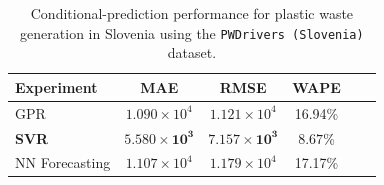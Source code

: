 \begin{table}[!ht]
	\centering
	\caption{\centering Conditional-prediction performance for plastic waste generation in Slovenia using the \texttt{PWDrivers (Slovenia)} dataset.}
	\begin{tabular}{@{}lccccc@{}}
		\toprule
		\textbf{Experiment} & \textbf{MAE}                   & \textbf{RMSE}                  & \textbf{WAPE}       \\
		\midrule
		GPR                 & \(1.090 \times 10^4\)          & \(1.121 \times 10^4\)          & 16.94\%             \\
		\textbf{SVR}        & \(\mathbf{5.580 \times 10^3}\) & \(\mathbf{7.157 \times 10^3}\) & \(\mathbf{8.67}\)\% \\
		NN Forecasting      & \(1.107 \times 10^4\)          & \(1.179 \times 10^4\)          & 17.17\%             \\
		\hline
	\end{tabular}
	\label{tab:multivariate_forecasting_slovenia_metrics}
\end{table}
